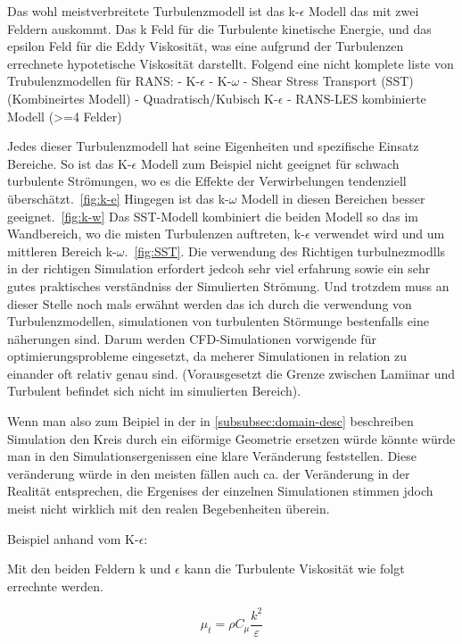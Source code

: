 \begin{refsection}
Das wohl meistverbreitete Turbulenzmodell ist das k-$\epsilon$ Modell das mit zwei Feldern auskommt. Das k Feld für die Turbulente kinetische Energie,
und das epsilon Feld für die Eddy Viskosität, was eine aufgrund der Turbulenzen errechnete hypotetische Viskosität darstellt.
Folgend eine nicht komplete liste von Trubulenzmodellen für RANS:
-	K-$\epsilon$
-	K-$\omega$
-	Shear Stress Transport (SST) (Kombineirtes Modell)
-	Quadratisch/Kubisch K-$\epsilon$
-	RANS-LES kombinierte Modell (>=4 Felder)

Jedes dieser Turbulenzmodell hat seine Eigenheiten und spezifische Einsatz Bereiche.
So ist das K-$\epsilon$ Modell zum Beispiel nicht geeignet für schwach turbulente Strömungen,
wo es die Effekte der Verwirbelungen tendenziell überschätzt.~\ref{fig:k-e}
Hingegen ist das k-$\omega$ Modell in diesen Bereichen besser geeignet.~\ref{fig:k-w}
Das SST-Modell kombiniert die beiden Modell so das im Wandbereich,
wo die misten Turbulenzen auftreten, k-$\epsilon$ verwendet wird und um mittleren Bereich k-$\omega$.~\ref{fig:SST}.
Die verwendung des Richtigen turbulnezmodlls in der richtigen Simulation erfordert jedcoh sehr viel erfahrung sowie ein sehr gutes praktisches verständniss der Simulierten Strömung.
Und trotzdem muss an dieser Stelle noch mals erwähnt werden das ich durch die verwendung von Turbulenzmodellen, simulationen von turbulenten Störmunge bestenfalls eine näherungen sind.
Darum werden CFD-Simulationen vorwigende für optimierungsprobleme eingesetzt, da meherer Simulationen in relation zu einander oft relativ genau sind. (Vorausgesetzt die Grenze zwischen Lamiinar und Turbulent befindet sich nicht im simulierten Bereich).

Wenn man also zum Beipiel in der in \ref{subsubsec:domain-desc} beschreiben Simulation den Kreis durch ein eiförmige Geometrie ersetzen würde könnte würde man in den Simulationsergenissen eine klare Veränderung feststellen.
Diese veränderung würde in den meisten fällen auch ca. der Veränderung in der Realität entsprechen, die Ergenises der einzelnen Simulationen stimmen jdoch meist nicht wirklich mit den realen Begebenheiten überein.

Beispiel anhand vom K-$\epsilon$:

Mit den beiden Feldern k und $\epsilon$ kann die Turbulente Viskosität wie folgt errechnte werden.

\begin{equation}
    \mu_t = \rho C_\mu \frac{k^2}{\varepsilon}
\end{equation}


\end{refsection}

